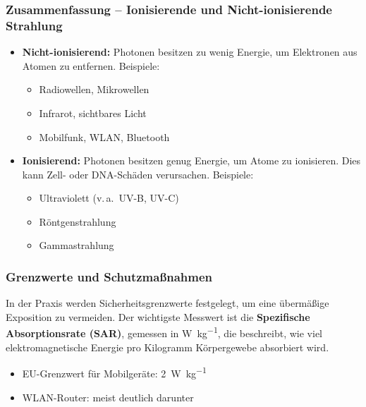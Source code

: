 \subsubsection{Zusammenfassung -- Ionisierende und  \newline Nicht-ionisierende Strahlung}
\vspace{1em}
\begin{tcolorbox}[physikbox,title=Ionisierende und Nicht-ionisierende Strahlung]
	\label{box:ionisierende}
	\begin{itemize}
		\item \textbf{Nicht-ionisierend:} Photonen besitzen zu wenig Energie, um Elektronen aus Atomen zu entfernen. Beispiele:
		\begin{itemize}
			\item Radiowellen, Mikrowellen
			\item Infrarot, sichtbares Licht
			\item Mobilfunk, WLAN, Bluetooth
		\end{itemize}
		\item \textbf{Ionisierend:} Photonen besitzen genug Energie, um Atome zu ionisieren. Dies kann Zell- oder DNA-Schäden verursachen. Beispiele:
		\begin{itemize}
			\item Ultraviolett (v.\,a.\ UV-B, UV-C)
			\item Röntgenstrahlung
			\item Gammastrahlung
		\end{itemize}
	\end{itemize}
\end{tcolorbox}
\vspace{1em}
\subsubsection{Grenzwerte und Schutzmaßnahmen}

In der Praxis werden Sicherheitsgrenzwerte festgelegt, um eine übermäßige Exposition zu vermeiden. Der wichtigste Messwert ist die \textbf{Spezifische Absorptionsrate (SAR)}, gemessen in \si{\watt\per\kilogram}, die beschreibt, wie viel elektromagnetische Energie pro Kilogramm Körpergewebe absorbiert wird.

\begin{itemize}
	\item EU-Grenzwert für Mobilgeräte: \SI{2}{\watt\per\kilogram}
	\item WLAN-Router: meist deutlich darunter
\end{itemize}


